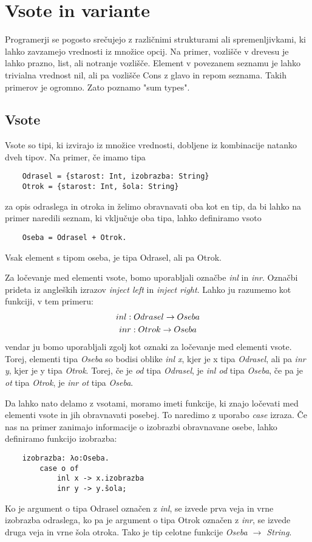 \documentclass[a4paper]{report}
\begin{document}
\section{Vsote in variante}
Programerji se pogosto srečujejo z različnimi strukturami ali spremenljivkami, ki lahko zavzamejo vrednosti iz množice opcij. Na primer, vozlišče v drevesu je lahko prazno, list, ali 
notranje vozlišče. Element v povezanem seznamu je lahko trivialna vrednost nil, ali pa vozlišče Cons z glavo in repom seznama. Takih primerov je ogromno. Zato poznamo "sum types".

\subsection{Vsote}
Vsote so tipi, ki izvirajo iz množice vrednosti, dobljene iz kombinacije natanko dveh tipov. Na primer, če imamo tipa
\begin{lstlisting}
    Odrasel = {starost: Int, izobrazba: String}
    Otrok = {starost: Int, šola: String}
\end{lstlisting}
za opis odraslega in otroka in želimo obravnavati oba kot en tip, da bi lahko na primer naredili seznam, ki vključuje oba tipa, lahko definiramo vsoto
\begin{lstlisting}
    Oseba = Odrasel + Otrok.
\end{lstlisting}
Vsak element s tipom oseba, je tipa Odrasel, ali pa Otrok.

Za ločevanje med elementi vsote, bomo uporabljali označbe \emph{inl} in \emph{inr}. Označbi prideta iz angleških izrazov \textit{inject left} in \textit{inject right}. Lahko ju razumemo kot
funkciji, v tem primeru:
\begin{gather}
    inl: Odrasel \rightarrow Oseba \notag\\
    inr: Otrok \rightarrow Oseba \notag
\end{gather}
vendar ju bomo uporabljali zgolj kot oznaki za ločevanje med elementi vsote. Torej, elementi tipa \emph{Oseba} so bodisi oblike \emph{inl x}, kjer je x tipa \emph{Odrasel}, ali pa \emph{inr y}, kjer je y 
tipa \emph{Otrok}. Torej, če je \emph{od} tipa \emph{Odrasel}, je \emph{inl od} tipa \emph{Oseba}, če pa je \emph{ot} tipa \emph{Otrok}, je \emph{inr ot} tipa \emph{Oseba}.

Da lahko nato delamo z vsotami, moramo imeti funkcije, ki znajo ločevati med elementi vsote in jih obravnavati posebej. To naredimo z uporabo \emph{case} izraza. Če nas na primer zanimajo 
informacije o izobrazbi obravnavane osebe, lahko definiramo funkcijo izobrazba:
\begin{lstlisting}
    izobrazba: λo:Oseba.
        case o of
            inl x -> x.izobrazba
            inr y -> y.šola;
\end{lstlisting}
Ko je argument o tipa Odrasel označen z \emph{inl}, se izvede prva veja in vrne izobrazba odraslega, ko pa je argument o tipa Otrok označen z \emph{inr}, se izvede druga veja in vrne šola
otroka. Tako je tip celotne funkcije \emph{Oseba $\rightarrow$ String}.
\end{document}
